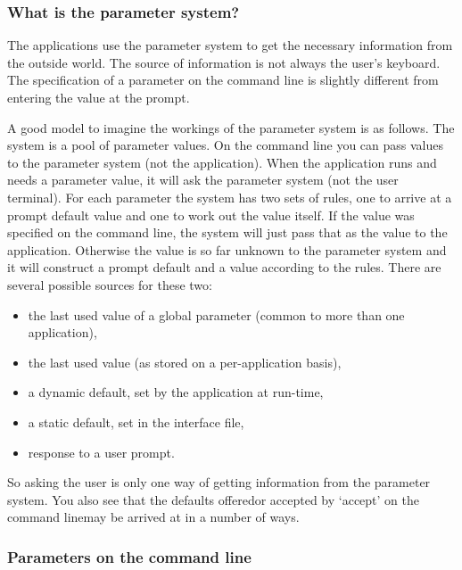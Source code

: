 \subsubsection{\label{paramswhatis}What is the parameter system?}

   The applications use the parameter system to get the necessary
   information from the outside world. The source of information is not
   always the user's keyboard. The specification of a parameter on the
   command line is slightly different from entering the value at the
   prompt.

   A good model to imagine the workings of the parameter system is as
   follows.  The system is a pool of parameter values. On the command
   line you can pass values to the parameter system (not the
   application). When the application runs and needs a parameter value,
   it will ask the parameter system (not the user terminal). For each
   parameter the system has two sets of rules, one to arrive at a
   prompt default value and one to work out the value itself. If the
   value was specified on the command line, the system will just pass
   that as the value to the application. Otherwise the value is so far
   unknown to the parameter system and it will construct a prompt
   default and a value according to the rules. There are several
   possible sources for these two:

\begin{itemize}
\item
   the last used value of a global parameter (common to more than one
   application),
\item
   the last used value (as stored on a per-application basis),
\item
   a dynamic default, set by the application at run-time,
\item
   a static default, set in the interface file,
\item
   response to a user prompt.
\end{itemize}

   So asking the user is only one way of getting information from the
   parameter system. You also see that the defaults offered\latorhtm{---}{-}or
   accepted by `accept' on the command line\latorhtm{---}{-}may be arrived
   at in a number of ways.


\subsubsection{\label{paramsonline}Parameters on the command line}

